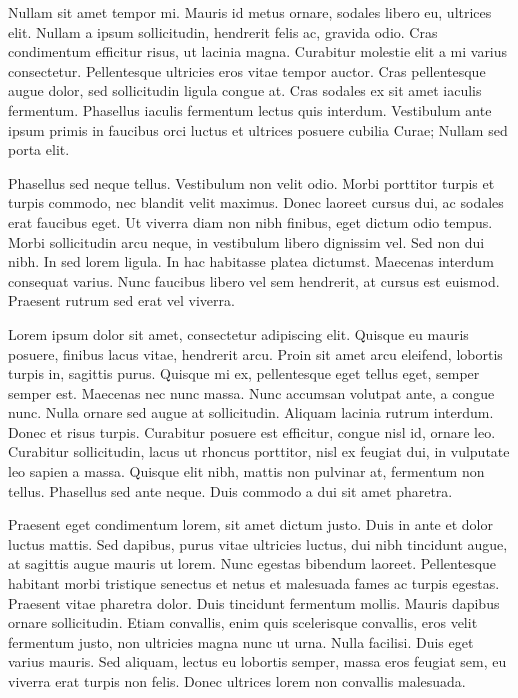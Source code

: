 \documentclass{article}
\begin{document}
	Nullam sit amet tempor mi. Mauris id metus ornare, sodales libero eu, ultrices elit. Nullam a ipsum sollicitudin, hendrerit felis ac, gravida odio. Cras condimentum efficitur risus, ut lacinia magna. Curabitur molestie elit a mi varius consectetur. Pellentesque ultricies eros vitae tempor auctor. Cras pellentesque augue dolor, sed sollicitudin ligula congue at. Cras sodales ex sit amet iaculis fermentum. Phasellus iaculis fermentum lectus quis interdum. Vestibulum ante ipsum primis in faucibus orci luctus et ultrices posuere cubilia Curae; Nullam sed porta elit.
	
	Phasellus sed neque tellus. Vestibulum non velit odio. Morbi porttitor turpis et turpis commodo, nec blandit velit maximus. Donec laoreet cursus dui, ac sodales erat faucibus eget. Ut viverra diam non nibh finibus, eget dictum odio tempus. Morbi sollicitudin arcu neque, in vestibulum libero dignissim vel. Sed non dui nibh. In sed lorem ligula. In hac habitasse platea dictumst. Maecenas interdum consequat varius. Nunc faucibus libero vel sem hendrerit, at cursus est euismod. Praesent rutrum sed erat vel viverra. 
	
	Lorem ipsum dolor sit amet, consectetur adipiscing elit. Quisque eu mauris posuere, finibus lacus vitae, hendrerit arcu. Proin sit amet arcu eleifend, lobortis turpis in, sagittis purus. Quisque mi ex, pellentesque eget tellus eget, semper semper est. Maecenas nec nunc massa. Nunc accumsan volutpat ante, a congue nunc. Nulla ornare sed augue at sollicitudin. Aliquam lacinia rutrum interdum. Donec et risus turpis. Curabitur posuere est efficitur, congue nisl id, ornare leo. Curabitur sollicitudin, lacus ut rhoncus porttitor, nisl ex feugiat dui, in vulputate leo sapien a massa. Quisque elit nibh, mattis non pulvinar at, fermentum non tellus. Phasellus sed ante neque. Duis commodo a dui sit amet pharetra.
	
	
	Praesent eget condimentum lorem, sit amet dictum justo. Duis in ante et dolor luctus mattis. Sed dapibus, purus vitae ultricies luctus, dui nibh tincidunt augue, at sagittis augue mauris ut lorem. Nunc egestas bibendum laoreet. Pellentesque habitant morbi tristique senectus et netus et malesuada fames ac turpis egestas. Praesent vitae pharetra dolor. Duis tincidunt fermentum mollis. Mauris dapibus ornare sollicitudin. Etiam convallis, enim quis scelerisque convallis, eros velit fermentum justo, non ultricies magna nunc ut urna. Nulla facilisi. Duis eget varius mauris. Sed aliquam, lectus eu lobortis semper, massa eros feugiat sem, eu viverra erat turpis non felis. Donec ultrices lorem non convallis malesuada.
	
\end{document}
